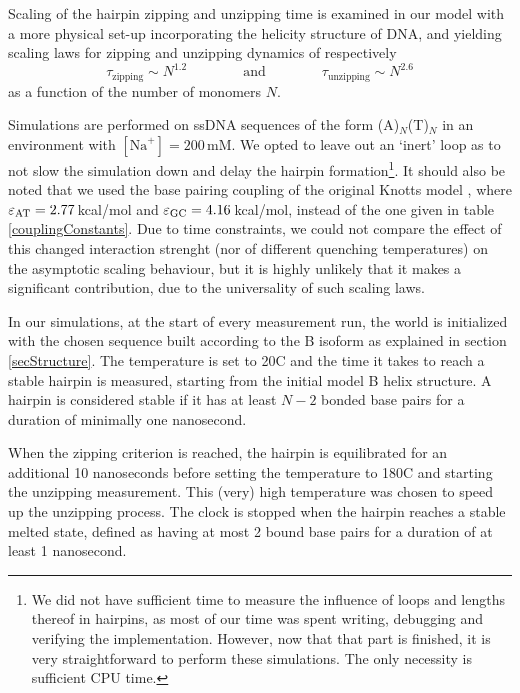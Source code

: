 Scaling of the hairpin zipping and unzipping time is examined in our model with a more physical set-up incorporating the helicity structure of DNA, and yielding scaling laws for zipping and unzipping dynamics of respectively
\begin{equation}
\tau_\text{zipping} \sim N^{1.2} \qquad \qquad \text{and} \qquad \qquad \tau_\text{unzipping} \sim N^{2.6}\end{equation}
as a function of the number of monomers $N$.

Simulations are performed on ssDNA sequences of the form (A)$_N$(T)$_N$ in an environment with $[\text{Na}^+] = 200$\,mM.
We opted to leave out an `inert' loop as to not slow the simulation down and delay the hairpin formation\footnote{We did not have sufficient time to measure the influence of loops and lengths thereof in hairpins, as most of our time was spent writing, debugging and verifying the implementation.
However, now that that part is finished, it is very straightforward to perform these simulations. The only necessity is sufficient CPU time.}.
It should also be noted that we used the base pairing coupling of the original Knotts model \cite{knotts2007coarse}, where $\varepsilon_\text{AT} = 2.77$\,kcal/mol and $\varepsilon_\text{GC} = 4.16$\,kcal/mol, instead of the one given in table \ref{couplingConstants}.
Due to time constraints, we could not compare the effect of this changed interaction strenght (nor of different quenching temperatures) on the asymptotic scaling behaviour, but it is highly unlikely that it makes a significant contribution, due to the universality of such scaling laws.




In our simulations, at the start of every measurement run, the world is initialized with the chosen sequence built according to the B isoform as explained in section \ref{secStructure}.
The temperature is set to 20{\degree}C and the time it takes to reach a stable hairpin is measured, starting from the initial model B helix structure.
A hairpin is considered stable if it has at least $N-2$ bonded base pairs for a duration of minimally one nanosecond.

When the zipping criterion is reached, the hairpin is equilibrated for an additional 10 nanoseconds before setting the temperature to 180{\degree}C and starting the unzipping measurement.
This (very) high temperature was chosen to speed up the unzipping process.
The clock is stopped when the hairpin reaches a stable melted state, defined as having at most 2 bound base pairs for a duration of at least 1 nanosecond.

